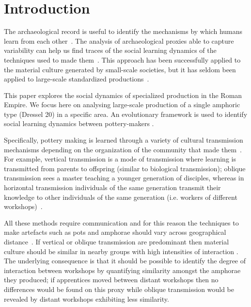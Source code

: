 \documentclass[review]{elsarticle}
\begin{document}
\linenumbers

\section{Introduction}

The archaeological record is useful to identify the mechanisms by which humans learn from each other~\citep{richerson2005not,eerkens_jelmer_cultural_2007}. The analysis of archaeological proxies able to capture variability can help us find traces of the social learning dynamics of the techniques used to made them~\citep{shennan_ceramic_2001,eerkens_jelmer_cultural_2005, gandon_copying_2014}. This approach has been successfully applied to the material culture generated by small-scale societies, but it has seldom been applied to large-scale standardized productions~\citep{shennan_isolation-by-distance_2015}.

This paper explores the social dynamics of specialized production in the Roman Empire. We focus here on analysing large-scale production of a single amphoric type (Dressel 20) in a specific area. An evolutionary framework is used to identify social learning dynamics between pottery-makers \citep{shennan_evolution_2008,mesoudi_cultural_2015}. 

Specifically, pottery making is learned through a variety of cultural transmission mechanisms depending on the organization of the community that made them~\citep{neff1992ceramics,shennan_genes_2002,bowser_learning_2008,hosfield_modes_2009}. For example, vertical transmission is a mode of transmission where learning is transmitted from parents to offspring (similar to biological transmission); oblique transmission sees a master teaching a younger generation of disciples, whereas in horizontal transmission individuals of the same generation transmit their knowledge to other individuals of the same generation (i.e. workers of different workshops)~\citep{cavalli-sforza_cultural_1981, acerbi_cultural_2006}.

All these methods require communication and for this reason the techniques to make artefacts such as pots and amphorae should vary across geographical distance~\citep{bjorklund_effect_2010,shennan_isolation-by-distance_2015, van_strien_isolation-by-distance_2015}. If vertical or oblique transmission are predominant then material culture should be similar in nearby groups with high intensities of interaction \citep{hart_effects_2012}. The underlying consequence is that it should be possible to identify the degree of interaction between workshops by quantifying similarity amongst the amphorae they produced; if apprentices moved between distant workshops then no differences would be found on this proxy while oblique transmission would be revealed by distant workshops exhibiting less similarity.
\end{document}
